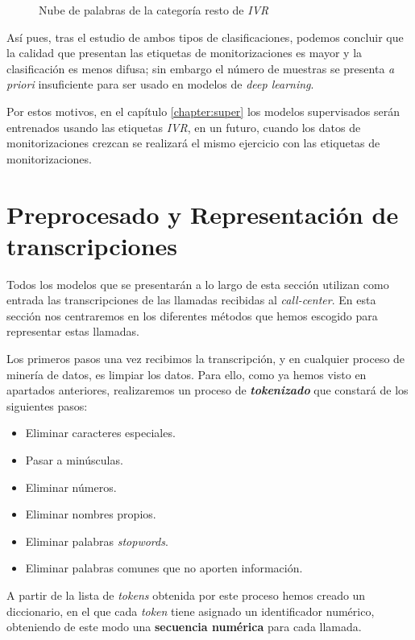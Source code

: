 \FloatBarrier
\begin{figure}[!ht]
	\centering
    \caption{Nube de palabras de la categoría resto de \textit{IVR}}
    \label{fig:cloudivr_resto}
\end{figure} 


Así pues, tras el estudio de ambos tipos de clasificaciones, podemos concluir que la calidad que presentan las etiquetas de monitorizaciones es mayor y la clasificación es menos difusa; sin embargo el número de muestras se presenta \textit{a priori} insuficiente para ser usado en modelos de \textit{deep learning}. 

Por estos motivos, en el capítulo \ref{chapter:super} los modelos supervisados serán entrenados usando las etiquetas \textit{IVR}, en un futuro, cuando los datos de monitorizaciones crezcan se realizará el mismo ejercicio con las etiquetas de monitorizaciones. 


\section{Preprocesado y Representación de transcripciones}
\label{section:data:repr}



Todos los modelos que se presentarán a lo largo de esta sección utilizan como entrada las transcripciones de las llamadas recibidas al \textit{call-center}. En esta sección nos centraremos en los diferentes métodos que hemos escogido para representar estas llamadas.


Los primeros pasos una vez recibimos la transcripción, y en cualquier proceso de minería de datos, es limpiar los datos. Para ello, como ya hemos visto en apartados anteriores, realizaremos un proceso de \textit{\textbf{tokenizado}} que constará de los siguientes pasos: 

\begin{itemize}
\item Eliminar caracteres especiales. 
\item Pasar a minúsculas. 
\item Eliminar números. 
\item Eliminar nombres propios. 
\item Eliminar palabras \textit{stopwords}. 
\item Eliminar palabras comunes que no aporten información.
\end{itemize}

A partir de la lista de \textit{tokens} obtenida por este proceso hemos creado un diccionario, en el que cada \textit{token} tiene asignado un identificador numérico, obteniendo de este modo una \textbf{secuencia numérica} para cada llamada. 


